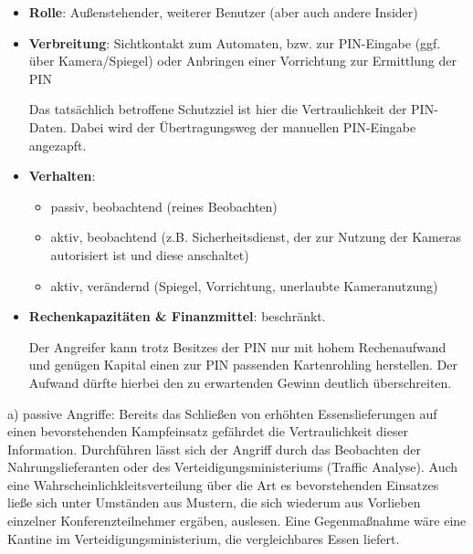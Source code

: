 \documentclass[ngerman]{fbi-aufgabenblatt}
\begin{document}
\begin{itemize}
	\item \textbf{Rolle}: Außenstehender, weiterer Benutzer (aber auch andere Insider)\\
	\item \textbf{Verbreitung}: Sichtkontakt zum Automaten, bzw. zur PIN-Eingabe (ggf. über Kamera/Spiegel)
	oder Anbringen einer Vorrichtung zur Ermittlung der PIN
	
	Das tatsächlich betroffene Schutzziel ist hier die Vertraulichkeit der PIN-Daten. Dabei wird der Übertragungsweg der manuellen PIN-Eingabe angezapft.\\
	
	
	\item \textbf{Verhalten}: \begin{itemize} 
		\item passiv, beobachtend (reines Beobachten)
		\item aktiv, beobachtend (z.B. Sicherheitsdienst, der zur Nutzung der Kameras autorisiert ist und diese anschaltet)  
		\item aktiv, verändernd (Spiegel, Vorrichtung, unerlaubte Kameranutzung)
	\end{itemize}
	\item \textbf{Rechenkapazitäten \& Finanzmittel}: beschränkt.

	
	Der Angreifer kann trotz Besitzes der PIN nur mit hohem Rechenaufwand und genügen Kapital einen zur PIN passenden Kartenrohling herstellen. Der Aufwand dürfte hierbei den zu erwartenden Gewinn deutlich überschreiten.
	
	
\end{itemize}

%

%
%
\newpage
{}

a) passive Angriffe: Bereits das Schließen von erhöhten Essenslieferungen auf einen bevorstehenden Kampfeinsatz gefährdet die Vertraulichkeit dieser Information. Durchführen lässt sich der Angriff durch das Beobachten der Nahrungslieferanten oder des Verteidigungsministeriums (Traffic Analyse). Auch eine Wahrscheinlichkleitsverteilung über die Art es bevorstehenden Einsatzes ließe sich unter Umständen aus Mustern, die sich wiederum aus Vorlieben einzelner Konferenzteilnehmer ergäben, auslesen. Eine Gegenmaßnahme wäre eine Kantine im Verteidigungsministerium, die vergleichbares Essen liefert.
\end{document}
